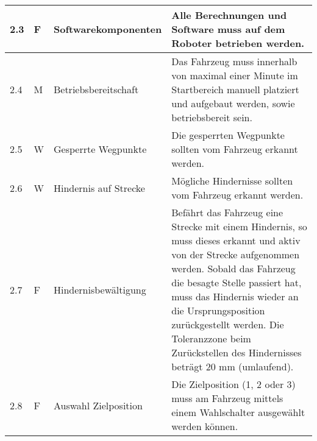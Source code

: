 \documentclass[main.tex]{subfiles} %
\begin{document}
\begin{tabular}{|l|p{0.5cm}|p{4cm}|p{10cm}|}
  \hline
  2.3          & F          & Softwarekomponenten   & Alle Berechnungen und Software muss auf dem Roboter betrieben werden.                                                                                                                                                                                                                                                                      \\
  \hline
  2.4          & M          & Betriebsbereitschaft  & Das Fahrzeug muss innerhalb von maximal einer Minute im Startbereich manuell platziert und aufgebaut werden, sowie betriebsbereit sein.                                                                                                                                                                                                    \\
  \hline
  2.5          & W          & Gesperrte Wegpunkte   & Die gesperrten Wegpunkte sollten vom Fahrzeug erkannt werden.                                                                                                                                                                                                                                                                              \\
  \hline
  2.6          & W          & Hindernis auf Strecke & Mögliche Hindernisse sollten vom Fahrzeug erkannt werden.                                                                                                                                                                                                                                                                                  \\
  \hline
  2.7          & F          & Hindernisbewältigung  & Befährt das Fahrzeug eine Strecke mit einem Hindernis, so muss dieses erkannt und aktiv von der Strecke aufgenommen werden. Sobald das Fahrzeug die besagte Stelle passiert hat, muss das Hindernis wieder an die Ursprungsposition zurückgestellt werden. Die Toleranzzone beim Zurückstellen des Hindernisses beträgt 20 mm (umlaufend). \\
  \hline
  2.8          & F          & Auswahl Zielposition  & Die Zielposition (1, 2 oder 3) muss am Fahrzeug mittels einem Wahlschalter ausgewählt werden können.                                                                                                                                                                                                                                       \\

\end{tabular}
\end{document}
